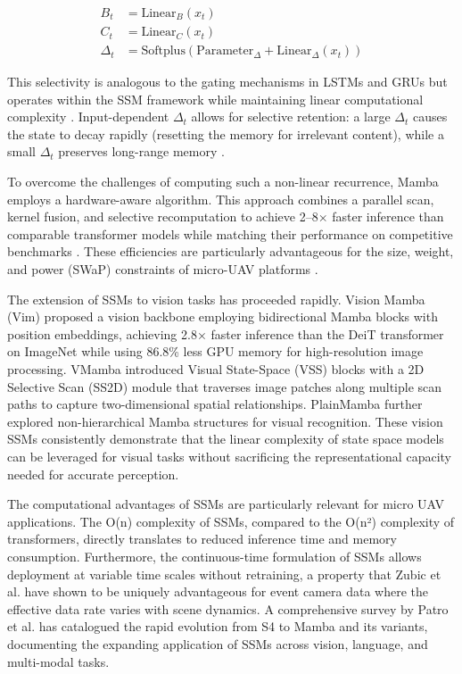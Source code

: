 \documentclass[11pt, a4paper]{report}
\begin{document}
\begin{align}
    B_t &= \text{Linear}_B(x_t) \\
    C_t &= \text{Linear}_C(x_t) \\
    \Delta_t &= \text{Softplus}(\text{Parameter}_\Delta + \text{Linear}_\Delta(x_t))
\end{align}

This selectivity is analogous to the gating mechanisms in LSTMs and GRUs but operates within the SSM framework while maintaining linear computational complexity \cite{gu2023mamba}. Input-dependent $\Delta_t$ allows for selective retention: a large $\Delta_t$ causes the state to decay rapidly (resetting the memory for irrelevant content), while a small $\Delta_t$ preserves long-range memory \cite{gu2023mamba, zubic2024state}. 

To overcome the challenges of computing such a non-linear recurrence, Mamba employs a hardware-aware algorithm. This approach combines a parallel scan, kernel fusion, and selective recomputation to achieve 2--8$\times$ faster inference than comparable transformer models while matching their performance on competitive benchmarks \cite{gu2023mamba}. These efficiencies are particularly advantageous for the size, weight, and power (SWaP) constraints of micro-UAV platforms \cite{gu2023mamba, patro2025from}.

The extension of SSMs to vision tasks has proceeded rapidly. Vision Mamba (Vim) \cite{zhu2024vision} proposed a vision backbone employing bidirectional Mamba blocks with position embeddings, achieving 2.8× faster inference than the DeiT transformer on ImageNet while using 86.8\% less GPU memory for high-resolution image processing. VMamba \cite{liu2024vmamba} introduced Visual State-Space (VSS) blocks with a 2D Selective Scan (SS2D) module that traverses image patches along multiple scan paths to capture two-dimensional spatial relationships. PlainMamba \cite{yang2024plainmamba} further explored non-hierarchical Mamba structures for visual recognition. These vision SSMs consistently demonstrate that the linear complexity of state space models can be leveraged for visual tasks without sacrificing the representational capacity needed for accurate perception. 

The computational advantages of SSMs are particularly relevant for micro UAV applications. The O(n) complexity of SSMs, compared to the O(n²) complexity of transformers, directly translates to reduced inference time and memory consumption. Furthermore, the continuous-time formulation of SSMs allows deployment at variable time scales without retraining, a property that Zubic et al. \cite{zubic2024state} have shown to be uniquely advantageous for event camera data where the effective data rate varies with scene dynamics. A comprehensive survey by Patro et al. \cite{patro2025from} has catalogued the rapid evolution from S4 to Mamba and its variants, documenting the expanding application of SSMs across vision, language, and multi-modal tasks. 
\end{document}
